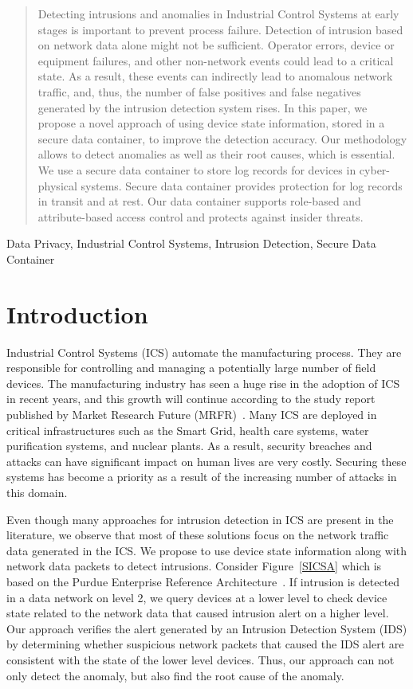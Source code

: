 \documentclass[conference]{IEEEtran}
\begin{document}
\begin{abstract}
Detecting intrusions and anomalies in Industrial Control Systems at early stages is important to prevent process failure. Detection of intrusion based on network data alone might not be sufficient. Operator errors, device or equipment failures, and other non-network events could lead to a critical state. As a result, these events can indirectly lead to anomalous network traffic, and, thus, the number of false positives and false negatives generated by the intrusion detection system rises. In this paper, we propose a novel approach of using device state information, stored in a secure data container, to improve the detection accuracy. Our methodology allows to detect anomalies as well as their root causes, which is essential. We use a secure data container to store log records for devices in cyber-physical systems. Secure data container provides protection for log records in transit and at rest. Our data container supports role-based and attribute-based access control and protects against insider threats. 
\end{abstract}

\begin{IEEEkeywords}
Data Privacy, Industrial Control Systems, Intrusion Detection, Secure Data Container
\end{IEEEkeywords}

\section{Introduction}
Industrial Control Systems (ICS) automate the manufacturing process. They are responsible for controlling and managing a potentially large number of field devices. The manufacturing industry has seen a huge rise in the adoption of ICS in recent years, and this growth will continue according to the study report published by Market Research Future (MRFR)~\cite{c1}. Many ICS are deployed in critical infrastructures such as the Smart Grid, health care systems, water purification systems, and nuclear plants. As a result, security breaches and attacks can have significant impact on human lives are very costly. Securing these systems has become a priority as a result of the increasing number of attacks in this domain. 
\par Even though many approaches for intrusion detection in ICS are present in the literature, we observe that most of these solutions focus on the network traffic data generated in the ICS. We propose to use device state information along with network data packets to detect intrusions. Consider Figure~\ref{SICSA} which is based on the Purdue Enterprise Reference Architecture~\cite{c11}. If intrusion is detected in a data network on level 2, we query devices at a lower level to check device state related to the network data that caused intrusion alert on a higher level. Our approach verifies the alert generated by an Intrusion Detection System (IDS) by determining whether suspicious network packets that caused the IDS alert are consistent with the state of the lower level devices. Thus, our approach can not only detect the anomaly, but also find the root cause of the anomaly. 
\end{document}
